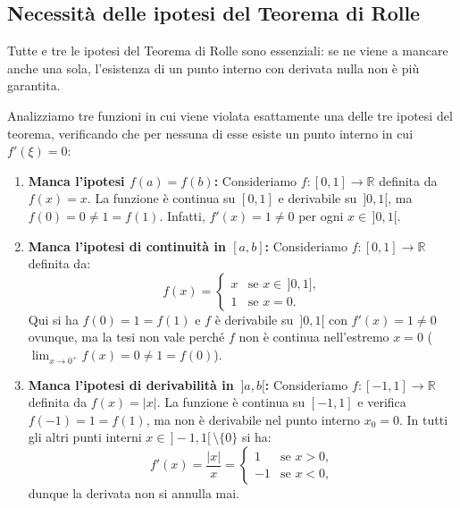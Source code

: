 \subsection{Necessità delle ipotesi del Teorema di Rolle}

Tutte e tre le ipotesi del Teorema di Rolle sono essenziali: se ne viene a mancare anche una sola, l'esistenza di un punto interno con derivata nulla non è più garantita.

\begin{esbox}
Analizziamo tre funzioni in cui viene violata esattamente una delle tre ipotesi del teorema, verificando che per nessuna di esse esiste un punto interno in cui $f'(\xi) = 0$:

\begin{enumerate}
    \item \textbf{Manca l'ipotesi $f(a) = f(b)$:} Consideriamo $f \colon [0, 1] \to \mathbb{R}$ definita da $f(x) = x$. La funzione è continua su $[0,1]$ e derivabile su $\,]0,1[$, ma $f(0) = 0 \neq 1 = f(1)$. Infatti, $f'(x) = 1 \neq 0$ per ogni $x \in \,]0,1[$.

    \item \textbf{Manca l'ipotesi di continuità in $[a,b]$:} Consideriamo $f \colon [0, 1] \to \mathbb{R}$ definita da:
    \[
        f(x) = \begin{cases} x & \text{se } x \in \,]0, 1], \\ 1 & \text{se } x = 0. \end{cases}
    \]
    Qui si ha $f(0) = 1 = f(1)$ e $f$ è derivabile su $\,]0,1[$ con $f'(x) = 1 \neq 0$ ovunque, ma la tesi non vale perché $f$ non è continua nell'estremo $x = 0$ ($\lim_{x \to 0^+} f(x) = 0 \neq 1 = f(0)$).

    \item \textbf{Manca l'ipotesi di derivabilità in $\,]a,b[$:} Consideriamo $f \colon [-1, 1] \to \mathbb{R}$ definita da $f(x) = |x|$. La funzione è continua su $[-1, 1]$ e verifica $f(-1) = 1 = f(1)$, ma non è derivabile nel punto interno $x_0 = 0$. In tutti gli altri punti interni $x \in \,]-1, 1[\, \setminus \{0\}$ si ha:
    \[
        f'(x) = \frac{|x|}{x} = \begin{cases} 1 & \text{se } x > 0, \\ -1 & \text{se } x < 0, \end{cases}
    \]
    dunque la derivata non si annulla mai.
\end{enumerate}


\end{esbox}
